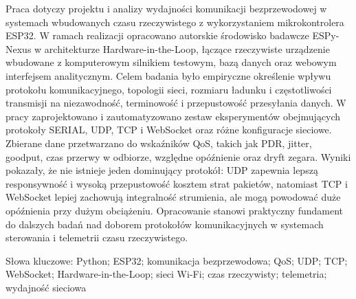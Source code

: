Praca dotyczy projektu i analizy wydajności komunikacji bezprzewodowej w systemach wbudowanych czasu rzeczywistego z wykorzystaniem mikrokontrolera ESP32. W ramach realizacji opracowano autorskie środowisko badawcze ESPy-Nexus w architekturze Hardware-in-the-Loop, łączące rzeczywiste urządzenie wbudowane z komputerowym silnikiem testowym, bazą danych oraz webowym interfejsem analitycznym. Celem badania było empiryczne określenie wpływu protokołu komunikacyjnego, topologii sieci, rozmiaru ładunku i częstotliwości transmisji na niezawodność, terminowość i przepustowość przesyłania danych. W pracy zaprojektowano i zautomatyzowano zestaw eksperymentów obejmujących protokoły SERIAL, UDP, TCP i WebSocket oraz różne konfiguracje sieciowe. Zbierane dane przetwarzano do wskaźników QoS, takich jak PDR, jitter, goodput, czas przerwy w odbiorze, względne opóźnienie oraz dryft zegara. Wyniki pokazały, że nie istnieje jeden dominujący protokół: UDP zapewnia lepszą responsywność i wysoką przepustowość kosztem strat pakietów, natomiast TCP i WebSocket lepiej zachowują integralność strumienia, ale mogą powodować duże opóźnienia przy dużym obciążeniu. Opracowanie stanowi praktyczny fundament do dalszych badań nad doborem protokołów komunikacyjnych w systemach sterowania i telemetrii czasu rzeczywistego.

Słowa kluczowe: Python; ESP32; komunikacja bezprzewodowa; QoS; UDP; TCP; WebSocket; Hardware-in-the-Loop; sieci Wi-Fi; czas rzeczywisty; telemetria; wydajność sieciowa
